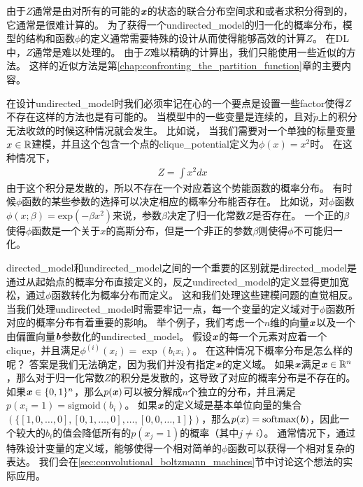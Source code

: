 由于$Z$通常是由对所有的可能的$\boldsymbol{\mathit{x}}$的状态的联合分布空间求和或者求积分得到的，它通常是很难计算的。
为了获得一个\gls{undirected_model}的归一化的概率分布，模型的结构和函数$\phi$的定义通常需要特殊的设计从而使得能够高效的计算$Z$。
在\gls{DL}中，$Z$通常是难以处理的。
由于$Z$难以精确的计算出，我们只能使用一些近似的方法。
这样的近似方法是第\ref{chap:confronting_the_partition_function}章的主要内容。



在设计\gls{undirected_model}时我们必须牢记在心的一个要点是设置一些\gls{factor}使得$Z$不存在这样的方法也是有可能的。
当模型中的一些变量是连续的，且对$\tilde{p}$上的积分无法收敛的时候这种情况就会发生。
比如说， 当我们需要对一个单独的标量变量$x\in\mathbb{R}$建模，并且这个包含一个点的\gls{clique_potential}定义为$\phi(x) = x^2$时。
在这种情况下，
\begin{align}
Z = \int x^2 dx
\end{align}
由于这个积分是发散的，所以不存在一个对应着这个势能函数的概率分布。
有时候$\phi$函数的某些参数的选择可以决定相应的概率分布能否存在。
比如说，对$\phi$函数$\phi(x;\beta) = \text{exp}(-\beta x^2)$来说，参数$\beta$决定了归一化常数$Z$是否存在。
一个正的$\beta$使得$\phi$函数是一个关于$x$的高斯分布，但是一个非正的参数$\beta$则使得$\phi$不可能归一化。


\gls{directed_model}和\gls{undirected_model}之间的一个重要的区别就是\gls{directed_model}是通过从起始点的概率分布直接定义的，反之\gls{undirected_model}的定义显得更加宽松，通过$\phi$函数转化为概率分布而定义。
这和我们处理这些建模问题的直觉相反。
当我们处理\gls{undirected_model}时需要牢记一点，每一个变量的定义域对于$\phi$函数所对应的概率分布有着重要的影响。
举个例子，我们考虑一个$n$维的向量$\boldsymbol{\mathit{x}}$以及一个由偏置向量$\boldsymbol{\mathit{b}}$参数化的\gls{undirected_model}。
假设$\boldsymbol{\mathit{x}}$的每一个元素对应着一个\gls{clique}，并且满足$\phi^{(i)}(x_i) = \exp(b_ix_i)$。
在这种情况下概率分布是怎么样的呢？
答案是我们无法确定，因为我们并没有指定$\boldsymbol{\mathit{x}}$的定义域。
如果$\boldsymbol{\mathit{x}}$满足$\boldsymbol{\mathit{x}} \in \mathbb{R}^n$，那么对于归一化常数$Z$的积分是发散的，这导致了对应的概率分布是不存在的。
如果$\boldsymbol{\mathit{x}}\in\{0,1\}^n$，那么$p(\boldsymbol{\mathit{x}})$可以被分解成$n$个独立的分布，并且满足$p(x_i=1) = \text{sigmoid}(b_i)$。
如果$\boldsymbol{\mathit{x}}$的定义域是基本单位向量的集合$(\{[1,0,\ldots,0],[0,1,\ldots,0],\ldots,[0,0,\ldots,1]\})$，那么$p(x) = \text{softmax}(\boldsymbol{\mathit{b}})$，因此一个较大的$b_i$的值会降低所有的$p(x_j = 1)$的概率（其中$j\neq i$）。
通常情况下，通过特殊设计变量的定义域，能够使得一个相对简单的$\phi$函数可以获得一个相对复杂的表达。
我们会在\ref{sec:convolutional_boltzmann_machines}节中讨论这个想法的实际应用。


